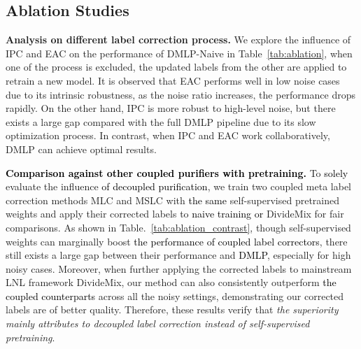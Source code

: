 \documentclass[10pt,twocolumn,letterpaper]{article}
\newcommand{\lyx}[1]{\textcolor{black}{#1}}
\begin{document}
\subsection{Ablation Studies}
 \textbf{Analysis on different label correction process.} We explore the influence of
IPC and EAC on the performance of DMLP-Naive in Table~\ref{tab:ablation}, {when one of the process is excluded, the updated labels from the other are applied to retrain a new model}. {It is observed} that EAC performs well in low noise cases due to its intrinsic robustness, as the noise ratio increases, the performance drops rapidly. On the other hand, IPC is more robust to {high-level noise}, but there exists a large gap {compared with the full DMLP pipeline due} to its slow optimization process. In contrast, {when IPC and EAC work collaboratively, DMLP can achieve optimal results}. 













\textbf{\lyx{Comparison against other coupled purifiers with pretraining.}} To \lyx{solely} evaluate the influence \lyx{of decoupled purification}, we train two coupled meta label correction methods MLC and MSLC with \lyx{the same} self-supervised pretrained weights and apply their corrected labels to \lyx{naive training or} DivideMix for fair comparisons. As shown in Table.~\ref{tab:ablation_contrast}, though self-supervised weights can marginally boost \lyx{the performance of coupled label correctors}, there still exists a large gap between their performance and \lyx{DMLP}, especially for high noisy cases. Moreover, when further applying the corrected labels to mainstream LNL framework DivideMix, our method can also consistently outperform \lyx{the coupled counterparts} across all the noisy settings, demonstrating our corrected labels are of better quality. Therefore, these results verify that \emph{the superiority mainly attributes to decoupled label correction instead of self-supervised pretraining}.    
 
\end{document}
